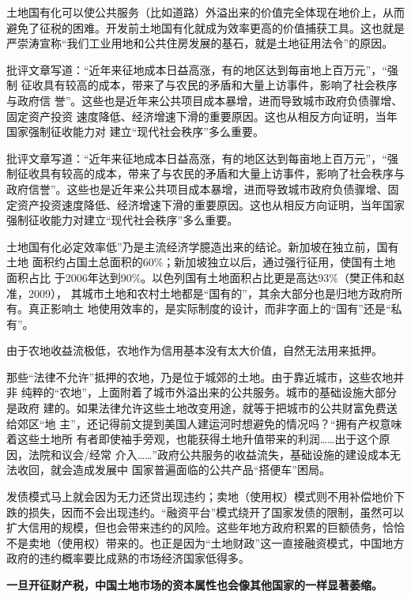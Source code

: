 土地国有化可以使公共服务（比如道路）外溢出来的价值完全体现在地价上，从而避免了征税的困难。开发前土地国有化就成为效率更高的价值捕获工具。这也就是严崇涛宣称“我们工业用地和公共住房发展的基石，就是土地征用法令”的原因。

批评文章写道：“近年来征地成本日益高涨，有的地区达到每亩地上百万元”，“强制
征收具有较高的成本，带来了与农民的矛盾和大量上访事件，影响了社会秩序与政府信
誉”。这些也是近年来公共项目成本暴增，进而导致城市政府负债骤增、固定资产投资
速度降低、经济增速下滑的重要原因。这也从相反方向证明，当年国家强制征收能力对
建立“现代社会秩序”多么重要。

批评文章写道：“近年来征地成本日益高涨，有的地区达到每亩地上百万元”，“强制征收具有较高的成本，带来了与农民的矛盾和大量上访事件，影响了社会秩序与政府信誉”。这些也是近年来公共项目成本暴增，进而导致城市政府负债骤增、固定资产投资速度降低、经济增速下滑的重要原因。这也从相反方向证明，当年国家强制征收能力对建立“现代社会秩序”多么重要。

土地国有化必定效率低”乃是主流经济学臆造出来的结论。新加坡在独立前，国有土地
面积约占国土总面积的60\%；新加坡独立以后，通过强行征用，使国有土地面积占比
于2006年达到90\%。以色列国有土地面积占比更是高达93\%（樊正伟和赵准，2009），
其城市土地和农村土地都是“国有的”，其余大部分也是归地方政府所有。真正影响土
地使用效率的，是实际制度的设计，而非字面上的“国有”还是“私有”。


由于农地收益流极低，农地作为信用基本没有太大价值，自然无法用来抵押。

那些“法律不允许”抵押的农地，乃是位于城郊的土地。由于靠近城市，这些农地并非
纯粹的“农地”，上面附着了城市外溢出来的公共服务。城市的基础设施大部分是政府
建的。如果法律允许这些土地改变用途，就等于把城市的公共财富免费送给郊区“地
主”，还记得前文提到美国人建运河时想避免的情况吗？“拥有产权意味着这些土地所
有者即使袖手旁观，也能获得土地升值带来的利润……出于这个原因，法院和议会/经常
介入……”政府公共服务的收益流失，基础设施的建设成本无法收回，就会造成发展中
国家普遍面临的公共产品“搭便车”困局。

发债模式马上就会因为无力还贷出现违约；卖地（使用权）模式则不用补偿地价下跌的损失，因而不会出现违约。“融资平台”模式绕开了国家发债的限制，虽然可以扩大信用的规模，但也会带来违约的风险。这些年地方政府积累的巨额债务，恰恰不是卖地（使用权）带来的。也正是因为“土地财政”这一直接融资模式，中国地方政府的违约概率要比成熟的市场经济国家低得多。


\textbf{一旦开征财产税，中国土地市场的资本属性也会像其他国家的一样显著萎缩。}

